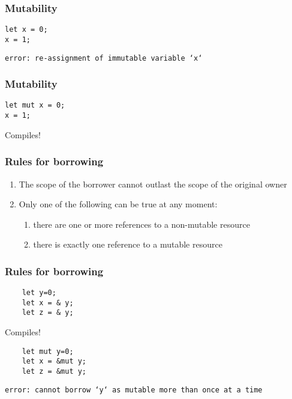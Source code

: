 \documentclass{beamer}
\begin{document}
\begin{frame}[fragile]
\frametitle{Mutability}

\begin{lstlisting}
let x = 0;
x = 1;
\end{lstlisting}

\texttt{error: re-assignment of immutable variable `x`}
\end{frame}



\begin{frame}[fragile]
\frametitle{Mutability}

\begin{lstlisting}
let mut x = 0;
x = 1;
\end{lstlisting}

Compiles! \Checkmark
\end{frame}

\begin{frame}
\frametitle{Rules for borrowing}
\begin{enumerate}
    \item The scope of the borrower cannot outlast the scope of the original owner
\item Only one of the following can be true at any moment:
    \begin{enumerate}
        \item there are one or more references to a non-mutable resource
        \item there is exactly one reference to a mutable resource
    \end{enumerate}
\end{enumerate}
\end{frame}


\begin{frame}[fragile]
\frametitle{Rules for borrowing}

\begin{lstlisting}
    let y=0;
    let x = & y; 
    let z = & y;
\end{lstlisting}

Compiles! \Checkmark

\pause 

\begin{lstlisting}
    let mut y=0;
    let x = &mut y; 
    let z = &mut y;
\end{lstlisting}

\texttt{error: cannot borrow `y` as mutable more than once at a time}

\end{frame}
\end{document}
